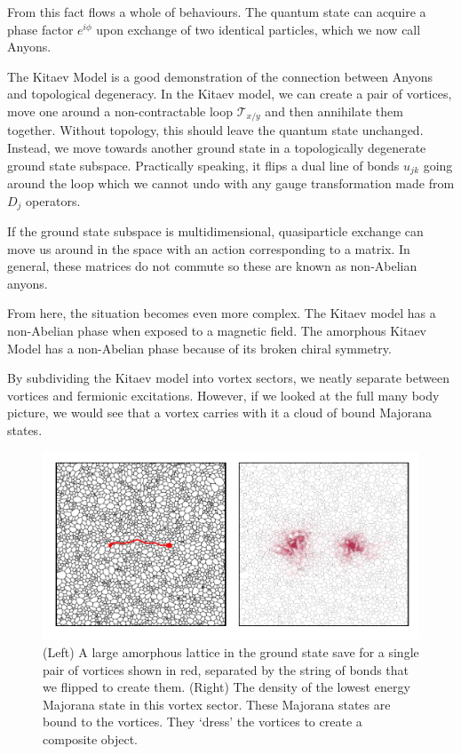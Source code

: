 From this fact flows a whole of behaviours. The quantum state can acquire a phase factor \(e^{i\phi}\) upon exchange of two identical particles, which we now call Anyons.

The Kitaev Model is a good demonstration of the connection between Anyons and topological degeneracy. In the Kitaev model, we can create a pair of vortices, move one around a non-contractable loop \(\mathcal{T}_{x/y}\) and then annihilate them together. Without topology, this should leave the quantum state unchanged. Instead, we move towards another ground state in a topologically degenerate ground state subspace. Practically speaking, it flips a dual line of bonds \(u_{jk}\) going around the loop which we cannot undo with any gauge transformation made from \(D_j\) operators.

If the ground state subspace is multidimensional, quasiparticle exchange can move us around in the space with an action corresponding to a matrix. In general, these matrices do not commute so these are known as non-Abelian anyons.

From here, the situation becomes even more complex. The Kitaev model has a non-Abelian phase when exposed to a magnetic field. The amorphous Kitaev Model has a non-Abelian phase because of its broken chiral symmetry.

By subdividing the Kitaev model into vortex sectors, we neatly separate between vortices and fermionic excitations. However, if we looked at the full many body picture, we would see that a vortex carries with it a cloud of bound Majorana states.

\begin{figure}
\hypertarget{fig:majorana_bound_states}{%
\centering
\includegraphics[width=1\textwidth,height=\textheight]{figure_code/amk_chapter/majorana_bound_states/majorana_bound_states}
\caption[Majorana Bound States]{(Left) A large amorphous lattice in the ground state save for a
single pair of vortices shown in red, separated by the string of bonds
that we flipped to create them. (Right) The density of the lowest energy
Majorana state in this vortex sector. These Majorana states are bound to
the vortices. They `dress' the vortices to create a composite
object.}\label{fig:majorana_bound_states}
}
\end{figure}

